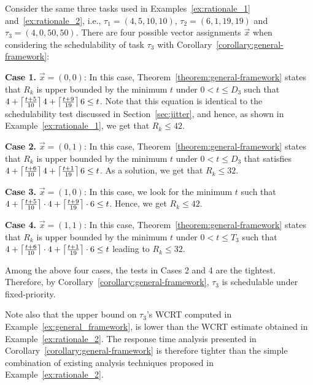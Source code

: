  \begin{example}
 \label{ex:general_framework}
  Consider the same three tasks used in Examples~\ref{ex:rationale_1} and~\ref{ex:rationale_2}, i.e., $\tau_1 = (4, 5, 10, 10)$, $\tau_2 =(6, 1, 19, 19)$ and $\tau_3 = (4, 0, 50, 50)$. There are four possible vector assignments $\vec{x}$ when considering the schedulability of task $\tau_3$ with Corollary~\ref{corollary:general-framework}:

\noindent\textbf{Case 1.} $\vec{x} = (0 , 0)$: In this case, Theorem~\ref{theorem:general-framework} states that $R_k$ is upper bounded by the minimum $t$ under $0 < t \leq D_3$ such that $4+ \left\lceil{\frac{t+5}{10}}\right\rceil 4 + \left\lceil{\frac{t+9}{19}}\right\rceil 6 \leq t$. Note that this equation is identical to the schedulability test discussed in Section~\ref{sec:jitter}, and hence, as shown in Example~\ref{ex:rationale_1}, we get that $R_k \leq 42$.

\noindent\textbf{Case 2.} $\vec{x} = (0 , 1)$:
 In this case, Theorem~\ref{theorem:general-framework} states that $R_k$ is upper bounded by  the minimum $t$
under $0 < t \leq D_3$ that satisfies $4+ \left\lceil{\frac{t+6}{10}}\right\rceil 4 + \left\lceil{\frac{t+1}{19}}\right\rceil 6 \leq t$. As a solution, we get that $R_k \leq 32$. %
       
\noindent\textbf{Case 3.} $\vec{x} = (1 , 0)$:
 In this case, we look for the minimum $t$ such that $4+ \left\lceil{\frac{t+5}{10}}\right\rceil\cdot 4 + \left\lceil{\frac{t+9}{19}}\right\rceil\cdot 6 \leq t$. Hence, we get $R_k \leq 42$.

\noindent\textbf{Case 4.} $\vec{x} = (1 , 1)$:
 In this case, Theorem~\ref{theorem:general-framework} states that $R_k$ is upper bounded by  the minimum $t$
under $0 < t \leq T_3$ such that $
       4+ \left\lceil{\frac{t+6}{10}}\right\rceil\cdot 4 + \left\lceil{\frac{t+1}{19}}\right\rceil\cdot 6 \leq t$ leading to $R_k \leq 32$.%

Among the above four cases, the tests in Cases 2 and 4 are the tightest. Therefore, by
Corollary~\ref{corollary:general-framework}, $\tau_3$ is
schedulable under fixed-priority.
\hfill\myendproof
 \end{example}

Note also that the upper bound on $\tau_3$'s WCRT computed in Example~\ref{ex:general_framework}, is lower than the WCRT estimate obtained in Example~\ref{ex:rationale_2}. The response time analysis presented in Corollary~\ref{corollary:general-framework} is therefore tighter than the simple combination of existing analysis techniques proposed in Example~\ref{ex:rationale_2}.






